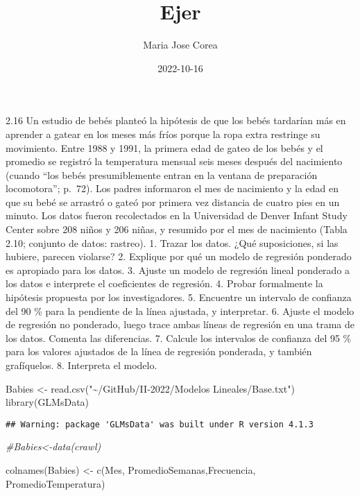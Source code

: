 \documentclass[
]{article}
\title{Ejer}
\author{Maria Jose Corea}
\date{2022-10-16}
\newenvironment{Shaded}{\begin{snugshade}}{\end{snugshade}}
\newcommand{\CommentTok}[1]{\textcolor[rgb]{0.56,0.35,0.01}{\textit{#1}}}
\newcommand{\FunctionTok}[1]{\textcolor[rgb]{0.00,0.00,0.00}{#1}}
\newcommand{\NormalTok}[1]{#1}
\newcommand{\OtherTok}[1]{\textcolor[rgb]{0.56,0.35,0.01}{#1}}
\newcommand{\StringTok}[1]{\textcolor[rgb]{0.31,0.60,0.02}{#1}}
\begin{document}
\maketitle

2.16 Un estudio de bebés planteó la hipótesis de que los bebés tardarían
más en aprender a gatear en los meses más fríos porque la ropa extra
restringe su movimiento. Entre 1988 y 1991, la primera edad de gateo de
los bebés y el promedio se registró la temperatura mensual seis meses
después del nacimiento (cuando ``los bebés presumiblemente entran en la
ventana de preparación locomotora''; p.~72). Los padres informaron el
mes de nacimiento y la edad en que su bebé se arrastró o gateó por
primera vez distancia de cuatro pies en un minuto. Los datos fueron
recolectados en la Universidad de Denver Infant Study Center sobre 208
niños y 206 niñas, y resumido por el mes de nacimiento (Tabla 2.10;
conjunto de datos: rastreo). 1. Trazar los datos. ¿Qué suposiciones, si
las hubiere, parecen violarse? 2. Explique por qué un modelo de
regresión ponderado es apropiado para los datos. 3. Ajuste un modelo de
regresión lineal ponderado a los datos e interprete el coeficientes de
regresión. 4. Probar formalmente la hipótesis propuesta por los
investigadores. 5. Encuentre un intervalo de confianza del 90 \% para la
pendiente de la línea ajustada, y interpretar. 6. Ajuste el modelo de
regresión no ponderado, luego trace ambas líneas de regresión en una
trama de los datos. Comenta las diferencias. 7. Calcule los intervalos
de confianza del 95 \% para los valores ajustados de la línea de
regresión ponderada, y también grafíquelos. 8. Interpreta el modelo.

\begin{Shaded}
\begin{Highlighting}[]
\NormalTok{Babies }\OtherTok{\textless{}{-}} \FunctionTok{read.csv}\NormalTok{(}\StringTok{"\textasciitilde{}/GitHub/II{-}2022/Modelos Lineales/Base.txt"}\NormalTok{)}
 \FunctionTok{library}\NormalTok{(GLMsData)}
\end{Highlighting}
\end{Shaded}

\begin{verbatim}
## Warning: package 'GLMsData' was built under R version 4.1.3
\end{verbatim}

\begin{Shaded}
\begin{Highlighting}[]
\CommentTok{\#Babies\textless{}{-}data(crawl)}

\FunctionTok{colnames}\NormalTok{(Babies) }\OtherTok{\textless{}{-}} \FunctionTok{c}\NormalTok{(}\StringTok{\textquotesingle{}Mes\textquotesingle{}}\NormalTok{, }\StringTok{\textquotesingle{}PromedioSemanas\textquotesingle{}}\NormalTok{,}\StringTok{\textquotesingle{}Frecuencia\textquotesingle{}}\NormalTok{, }\StringTok{\textquotesingle{}PromedioTemperatura\textquotesingle{}}\NormalTok{)}
\end{Highlighting}
\end{Shaded}
\end{document}
